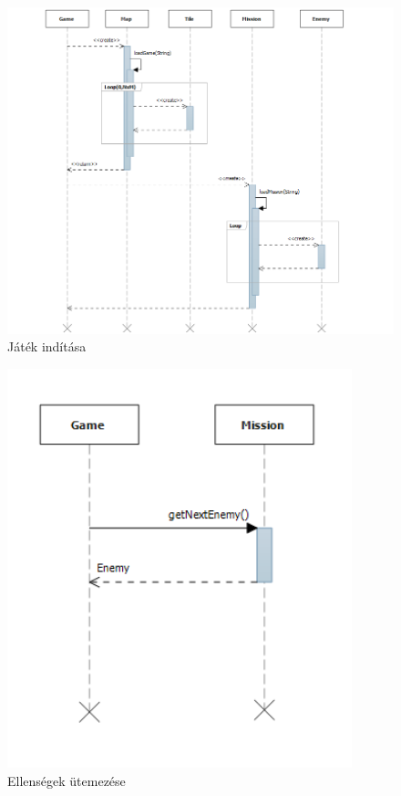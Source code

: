 \begin{figure}[H]
\begin{center}
\includegraphics[width=19cm]{images/starting_game.png}
\caption{Játék indítása}
\label{fig:starting_game}
\end{center}
\end{figure}

\begin{figure}[H]
\begin{center}
\includegraphics[width=10cm]{images/scheduling_enemies.png}
\caption{Ellenségek ütemezése}
\label{fig:scheduling_enemies}
\end{center}
\end{figure}

